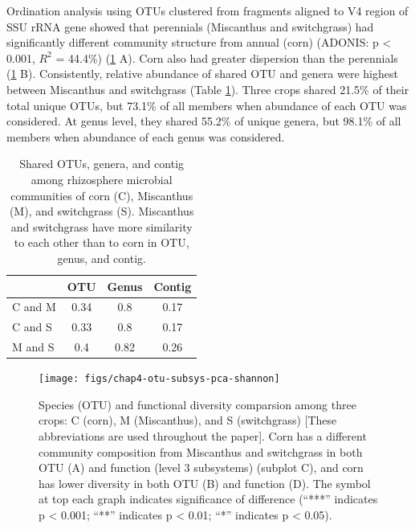 \documentclass[]{msu-thesis}
\begin{document}
Ordination analysis using OTUs clustered from fragments aligned to V4 region of SSU rRNA gene showed that perennials (Miscanthus and switchgrass) had significantly different community structure from annual (corn) (ADONIS: p < 0.001, $R^2$ = 44.4\%) (\cref{fig:chap4Fig1} A). Corn also had greater dispersion than the perennials (\cref{fig:chap4Fig1} B). Consistently, relative abundance of shared OTU and genera were highest between Miscanthus and switchgrass (Table \ref{tab:chap4TabS3}). Three crops shared 21.5\% of their total unique OTUs, but 73.1\% of all members when abundance of each OTU was considered. At genus level, they shared 55.2\% of unique genera, but 98.1\% of all members when abundance of each genus was considered.



\begin{table}[htbp]
  \centering
  \caption[Shared OTUs, genera, and contig among three crops]{Shared OTUs, genera, and contig among rhizosphere microbial communities of corn (C), Miscanthus (M), and switchgrass (S). Miscanthus and switchgrass have more similarity to each other than to corn in OTU, genus, and contig.}
    \begin{tabular}{|lccc|}
    \toprule
          & OTU   & Genus & Contig \\
    \midrule
    C and M & 0.34  & 0.8   & 0.17 \\
    C and S & 0.33  & 0.8   & 0.17 \\
    M and S & 0.4   & 0.82  & 0.26 \\
    \bottomrule
    \end{tabular}%
  \label{tab:chap4TabS3}%
\end{table}%





\begin{figure}[tbph!]
  \centering
  \texttt{[image: figs/chap4-otu-subsys-pca-shannon]}
  \caption[Species (OTU) and functional diversity comparsion among three crops]{Species (OTU) and functional diversity comparsion among three crops: C (corn), M (Miscanthus), and S (switchgrass) [These abbreviations are used throughout the paper]. Corn has a different community composition from Miscanthus and switchgrass in both OTU (A) and function (level 3 subsystems) (subplot C), and corn has lower diversity in both OTU (B) and function (D). The symbol at top each graph indicates significance of difference (``***'' indicates p < 0.001; ``**'' indicates p < 0.01; ``*'' indicates p < 0.05).}
  \label{fig:chap4Fig1}
\end{figure}
\end{document}
